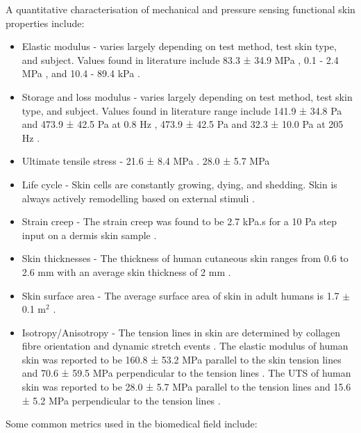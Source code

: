 A quantitative characterisation of mechanical and pressure sensing functional skin properties include:
\begin{itemize}
    \item Elastic modulus -  varies largely depending on test method, test skin type, and subject. Values found in literature include 83.3 ± 34.9 MPa \cite{Annaidh2012}, 0.1 - 2.4 MPa \cite{Khaothong2010}, and 10.4 - 89.4 kPa \cite{Zheng1999}.
    \item Storage and loss modulus - varies largely depending on test method, test skin type, and subject. Values found in literature range include 141.9 ± 34.8 Pa and 473.9 ± 42.5 Pa at 0.8 Hz \cite{Holt2008}, 473.9 ± 42.5 Pa and 32.3 ± 10.0 Pa at 205 Hz \cite{Parvini2022}.
    \item Ultimate tensile stress - 21.6 ± 8.4 MPa \cite{Annaidh2012}. 28.0 ± 5.7 MPa \cite{Ottenio2015}
    \item Life cycle - Skin cells are constantly growing, dying, and shedding. Skin is always actively remodelling based on external stimuli \cite{McGrath2010}.
    \item Strain creep - The strain creep was found to be 2.7 kPa.s for a 10 Pa step input on a dermis skin sample \cite{Holt2008}.
    \item Skin thicknesses - The thickness of human cutaneous skin ranges from 0.6 to 2.6 mm with an average skin thickness of 2 mm \cite{Landry2021}.
    \item Skin surface area - The average surface area of skin in adult humans is 1.7 $\pm$ 0.1 m$^2$ \cite{Landry2021}.
    \item Isotropy/Anisotropy - The tension lines in skin are determined by collagen fibre orientation and dynamic stretch events \cite{Newell2007,Paul2018}. The elastic modulus of human skin was reported to be 160.8 ± 53.2 MPa parallel to the skin tension lines and 70.6 ± 59.5 MPa perpendicular to the tension lines \cite{Ottenio2015}. The UTS of human skin was reported to be 28.0 ± 5.7 MPa parallel to the tension lines and 15.6 ± 5.2 MPa perpendicular to the tension lines \cite{Ottenio2015}.    
\end{itemize}
Some common metrics used in the biomedical field include:
